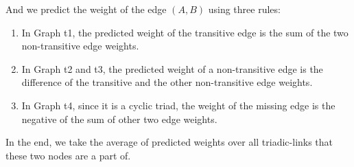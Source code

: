 And we predict the weight of the edge $(A, B)$ using three rules:

\begin{enumerate}

\item In Graph t1, the predicted weight of the transitive edge is the sum of the two non-transitive edge weights.

\item In Graph t2 and t3, the predicted weight of a non-transitive edge is the difference of the transitive and the other non-transitive edge weights. 

\item In Graph t4, since it is a cyclic triad, the weight of the missing edge is the negative of the sum of other two edge weights.

\end{enumerate}

In the end, we take the average of predicted weights over all triadic-links that these two nodes are a part of.



